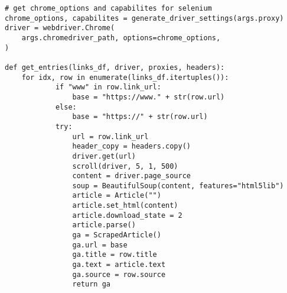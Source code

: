 \begin{verbatim}
# get chrome_options and capabilites for selenium
chrome_options, capabilites = generate_driver_settings(args.proxy)
driver = webdriver.Chrome(
    args.chromedriver_path, options=chrome_options,
)

def get_entries(links_df, driver, proxies, headers):
    for idx, row in enumerate(links_df.itertuples()):
            if "www" in row.link_url:
                base = "https://www." + str(row.url)
            else:
                base = "https://" + str(row.url)
            try:
                url = row.link_url
                header_copy = headers.copy()
                driver.get(url)
                scroll(driver, 5, 1, 500)
                content = driver.page_source
                soup = BeautifulSoup(content, features="html5lib")
                article = Article("")
                article.set_html(content)
                article.download_state = 2
                article.parse()
                ga = ScrapedArticle()
                ga.url = base
                ga.title = row.title
                ga.text = article.text
                ga.source = row.source
                return ga
\end{verbatim}